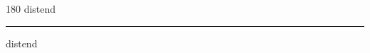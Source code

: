 
\begin{frame}
\begin{center}
\begin{turn}{180}
{\fontsize{2.5cm}{1em}\selectfont distend}
\end{turn}
\vspace{1em}\par  
\hrule
\vspace{1em}\par  
{\fontsize{2.5cm}{1em}\selectfont distend}
\end{center}
\end{frame}
